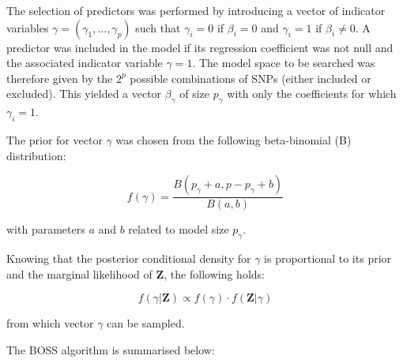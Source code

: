 
The selection of predictors was performed by introducing a vector of
indicator variables $\gamma=(\gamma_1, \ldots, \gamma_p)$ such that
$\gamma_i=0$ if $\beta_i=0$ and $\gamma_i=1$ if $\beta_i \neq 0$. A predictor
was included in the model if its regression coefficient was
not null and the associated indicator variable $\gamma=1$.
The model space to be searched was therefore given by the $2^p$ possible
combinations of SNPs (either included or excluded). This yielded a vector
$\beta_{\gamma}$ of size $p_{\gamma}$ with only the coefficients for which $\gamma_i=1$.

The prior for vector $\gamma$ was chosen from the following
beta-binomial (B) distribution: 

\begin{equation}
f(\gamma)=\frac{B(p_{\gamma}+a,p-p_{\gamma}+b)}{B(a,b)}
\label{eq:gammaprior}
\end{equation}


with parameters $a$ and $b$ related to model size $p_{\gamma}$.

Knowing that the posterior conditional density for $\gamma$ is
proportional to its prior and the marginal likelihood of $\mathbf{Z}$,
the following holds: 

\begin{equation}
f(\gamma|\mathbf{Z}) \propto f(\gamma) \cdot f(\mathbf{Z}|\gamma)
\label{eq:gammapost}
\end{equation}

from which vector $\gamma$ can be sampled.
 




The BOSS algorithm is summarised below:

